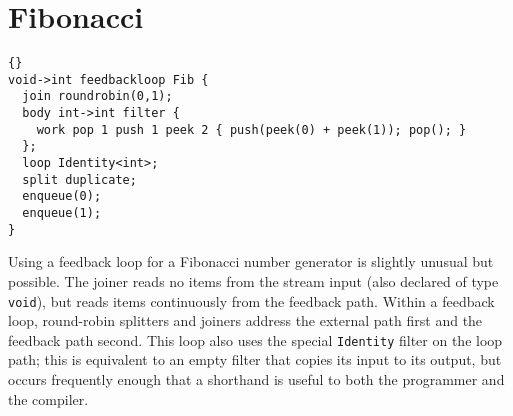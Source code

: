 \clearpage
\section{Fibonacci}

\begin{lstlisting}{}
void->int feedbackloop Fib {
  join roundrobin(0,1);
  body int->int filter { 
    work pop 1 push 1 peek 2 { push(peek(0) + peek(1)); pop(); }
  };
  loop Identity<int>;
  split duplicate;
  enqueue(0);
  enqueue(1);
}
\end{lstlisting}

Using a feedback loop for a Fibonacci number generator is slightly
unusual but possible.  The joiner reads no items from the stream input
(also declared of type \lstinline|void|), but reads items continuously
from the feedback path.  Within a feedback loop, round-robin splitters
and joiners address the external path first and the feedback path
second.  This loop also uses the special \lstinline|Identity| filter
on the loop path; this is equivalent to an empty filter that copies
its input to its output, but occurs frequently enough that a shorthand
is useful to both the programmer and the compiler.

